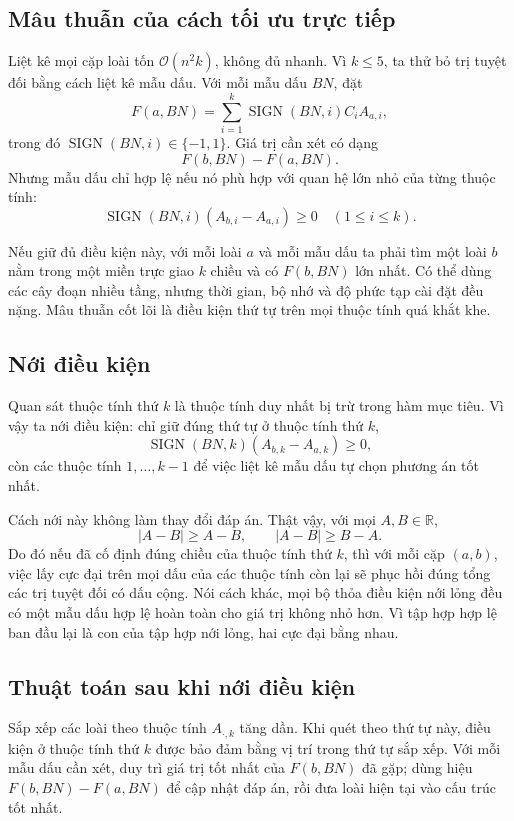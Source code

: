 \documentclass[11pt]{article}
\newcommand{\Oh}{\mathcal{O}}
\begin{document}
\subsection{Mâu thuẫn của cách tối ưu trực tiếp}

Liệt kê mọi cặp loài tốn \(\Oh(n^2k)\), không đủ nhanh. Vì \(k\le 5\), ta thử
bỏ trị tuyệt đối bằng cách liệt kê mẫu dấu. Với mỗi mẫu dấu \(BN\), đặt
\[
  F(a,BN)=\sum_{i=1}^{k}\operatorname{SIGN}(BN,i)C_iA_{a,i},
\]
trong đó \(\operatorname{SIGN}(BN,i)\in\{-1,1\}\). Giá trị cần xét có dạng
\[
  F(b,BN)-F(a,BN).
\]
Nhưng mẫu dấu chỉ hợp lệ nếu nó phù hợp với quan hệ lớn nhỏ của từng thuộc
tính:
\[
  \operatorname{SIGN}(BN,i)(A_{b,i}-A_{a,i})\ge 0
  \quad (1\le i\le k).
\]

Nếu giữ đủ điều kiện này, với mỗi loài \(a\) và mỗi mẫu dấu ta phải tìm một
loài \(b\) nằm trong một miền trực giao \(k\) chiều và có \(F(b,BN)\) lớn
nhất. Có thể dùng các cây đoạn nhiều tầng, nhưng thời gian, bộ nhớ và độ phức
tạp cài đặt đều nặng. Mâu thuẫn cốt lõi là điều kiện thứ tự trên mọi thuộc
tính quá khắt khe.

\subsection{Nới điều kiện}

Quan sát thuộc tính thứ \(k\) là thuộc tính duy nhất bị trừ trong hàm mục tiêu.
Vì vậy ta nới điều kiện: chỉ giữ đúng thứ tự ở thuộc tính thứ \(k\),
\[
  \operatorname{SIGN}(BN,k)(A_{b,k}-A_{a,k})\ge 0,
\]
còn các thuộc tính \(1,\ldots,k-1\) để việc liệt kê mẫu dấu tự chọn phương án
tốt nhất.

Cách nới này không làm thay đổi đáp án. Thật vậy, với mọi \(A,B\in\mathbb{R}\),
\[
  |A-B|\ge A-B,\qquad |A-B|\ge B-A.
\]
Do đó nếu đã cố định đúng chiều của thuộc tính thứ \(k\), thì với mỗi cặp
\((a,b)\), việc lấy cực đại trên mọi dấu của các thuộc tính còn lại sẽ phục
hồi đúng tổng các trị tuyệt đối có dấu cộng. Nói cách khác, mọi bộ thỏa điều
kiện nới lỏng đều có một mẫu dấu hợp lệ hoàn toàn cho giá trị không nhỏ hơn.
Vì tập hợp hợp lệ ban đầu lại là con của tập hợp nới lỏng, hai cực đại bằng
nhau.

\subsection{Thuật toán sau khi nới điều kiện}

Sắp xếp các loài theo thuộc tính \(A_{\cdot,k}\) tăng dần. Khi quét theo thứ
tự này, điều kiện ở thuộc tính thứ \(k\) được bảo đảm bằng vị trí trong thứ tự
sắp xếp. Với mỗi mẫu dấu cần xét, duy trì giá trị tốt nhất của \(F(b,BN)\) đã
gặp; dùng hiệu \(F(b,BN)-F(a,BN)\) để cập nhật đáp án, rồi đưa loài hiện tại
vào cấu trúc tốt nhất.
\end{document}
